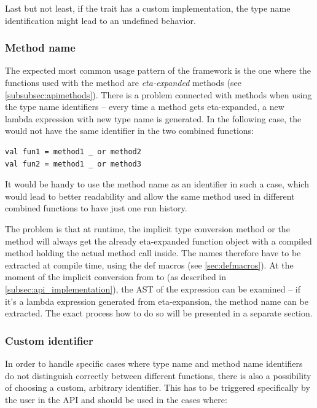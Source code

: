 Last but not least, if the  trait has a custom implementation, the type name identification might lead to an undefined behavior.

\subsubsection{Method name}
\label{subsec:methodnameident}


The expected most common usage pattern of the framework is the one where the functions used with the  method are \textit{eta-expanded} methods (see \ref{subsubsec:apimethods}). There is a problem connected with methods when using the type name identifiers -- every time a method gets eta-expanded, a new lambda expression with new type name is generated. In the following case, the  would not have the same identifier in the two combined functions:

\lstset{style=Scala}
\begin{lstlisting}
val fun1 = method1 _ or method2
val fun2 = method1 _ or method3
\end{lstlisting}



It would be handy to use the method name as an identifier in such a case, which would lead to better readability and allow the same method used in different combined functions to have just one run history.

The problem is that at runtime, the implicit type conversion method or the  method will always get the already eta-expanded function object with a compiled  method holding the actual method call inside. The names therefore have to be extracted at compile time, using the def macros (see \ref{sec:defmacros}). At the moment of the implicit conversion from  to  (as described in \ref{subsec:api_implementation}), the AST of the  expression can be examined -- if it's a lambda expression generated from eta-expansion, the method name can be extracted. The exact process how to do so will be presented in a separate section.

\subsubsection{Custom identifier}
\label{subsubsec:custom_identifier}

In order to handle specific cases where type name and method name identifiers do not distinguish correctly between different functions, there is also a possibility of choosing a custom, arbitrary identifier. This has to be triggered specifically by the user in the API and should be used in the cases where:

